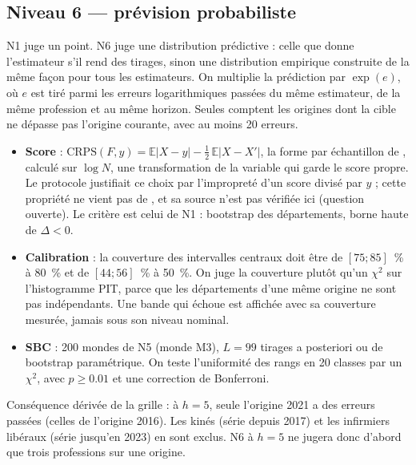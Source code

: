 \subsection{Niveau 6 --- prévision probabiliste}
N1 juge un point. N6 juge une distribution prédictive : celle que donne l'estimateur s'il rend des
tirages, sinon une distribution empirique construite de la même façon pour tous les estimateurs.
On multiplie la prédiction par $\exp(e)$, où $e$ est tiré parmi les erreurs logarithmiques passées
du même estimateur, de la même profession et au même horizon. Seules comptent les origines dont la
cible ne dépasse pas l'origine courante, avec au moins 20\suppose{} erreurs.
\begin{itemize}
  \item \textbf{Score} : $\mathrm{CRPS}(F, y) = \mathbb{E}|X - y| - \tfrac12\,\mathbb{E}|X - X'|$,
        la forme par échantillon de \citet[éq.~21, au signe près]{a3-gneiting2007jasa}, calculé sur
        $\log N$, une transformation de la variable qui garde le score propre. Le protocole
        justifiait ce choix par l'impropreté d'un score divisé par $y$ ; cette propriété ne vient pas
        de \citet{a3-gneiting2007jasa}, et sa source n'est pas vérifiée ici (question ouverte). Le critère est celui de N1 : bootstrap des départements, borne haute de $\Delta < 0$.
  \item \textbf{Calibration} : la couverture des intervalles centraux doit être de
        $[75 ; 85]$\suppose{}~\% à 80~\% et de $[44 ; 56]$\suppose{}~\% à 50~\%. On juge la
        couverture plutôt qu'un $\chi^2$ sur l'histogramme PIT, parce que les départements d'une
        même origine ne sont pas indépendants. Une bande qui échoue est affichée avec sa couverture
        mesurée, jamais sous son niveau nominal.
  \item \textbf{SBC} : 200 mondes de N5 (monde M3), $L = 99$ tirages a posteriori ou de bootstrap
        paramétrique. On teste l'uniformité des rangs en 20 classes par un $\chi^2$, avec
        $p \ge \num{0.01}$\suppose{} et une correction de Bonferroni.
\end{itemize}
Conséquence dérivée de la grille : à $h = 5$, seule l'origine 2021 a des erreurs passées (celles de
l'origine 2016). Les kinés (série depuis 2017) et les infirmiers libéraux (série jusqu'en 2023) en
sont exclus\derive{}. N6 à $h = 5$ ne jugera donc d'abord que trois professions sur une origine.


